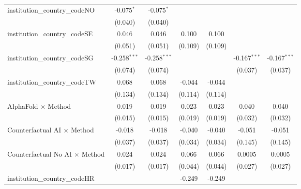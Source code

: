 \begin{tabular}{lcccccc}
   institution\_country\_codeNO          & -0.075$^{*}$   & -0.075$^{*}$   &               &               &                &   \\   
                                         & (0.040)        & (0.040)        &               &               &                &   \\   
   institution\_country\_codeSE          & 0.046          & 0.046          & 0.100         & 0.100         &                &   \\   
                                         & (0.051)        & (0.051)        & (0.109)       & (0.109)       &                &   \\   
   institution\_country\_codeSG          & -0.258$^{***}$ & -0.258$^{***}$ &               &               & -0.167$^{***}$ & -0.167$^{***}$\\   
                                         & (0.074)        & (0.074)        &               &               & (0.037)        & (0.037)\\   
   institution\_country\_codeTW          & 0.068          & 0.068          & -0.044        & -0.044        &                &   \\   
                                         & (0.134)        & (0.134)        & (0.114)       & (0.114)       &                &   \\   
   AlphaFold $\times$ Method             & 0.019          & 0.019          & 0.023         & 0.023         & 0.040          & 0.040\\   
                                         & (0.015)        & (0.015)        & (0.019)       & (0.019)       & (0.032)        & (0.032)\\   
   Counterfactual AI $\times$ Method     & -0.018         & -0.018         & -0.040        & -0.040        & -0.051         & -0.051\\   
                                         & (0.037)        & (0.037)        & (0.034)       & (0.034)       & (0.145)        & (0.145)\\   
   Counterfactual No AI $\times$ Method  & 0.024          & 0.024          & 0.066         & 0.066         & 0.0005         & 0.0005\\   
                                         & (0.017)        & (0.017)        & (0.044)       & (0.044)       & (0.027)        & (0.027)\\   
   institution\_country\_codeHR          &                &                & -0.249        & -0.249        &                &   \\   

\end{tabular}
